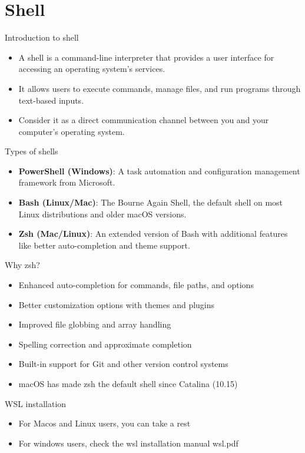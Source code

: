\section{Shell}

\begin{frame}[fragile]{Introduction to shell}
	\begin{itemize}
		\item A shell is a command-line interpreter that provides a user interface for accessing an operating system's services.
		\item It allows users to execute commands, manage files, and run programs through text-based inputs.
		\item Consider it as a direct communication channel between you and your computer's operating system.
	\end{itemize}
\end{frame}

\begin{frame}[fragile]{Types of shells}
	\begin{itemize}
		\item \textbf{PowerShell (Windows)}: A task automation and configuration management framework from Microsoft.
		\item \textbf{Bash (Linux/Mac)}: The Bourne Again Shell, the default shell on most Linux distributions and older macOS versions.
		\item \textbf{Zsh (Mac/Linux)}: An extended version of Bash with additional features like better auto-completion and theme support.
	\end{itemize}
\end{frame}

\begin{frame}[fragile]{Why zsh?}
	\begin{itemize}
		\item Enhanced auto-completion for commands, file paths, and options
		\item Better customization options with themes and plugins
		\item Improved file globbing and array handling
		\item Spelling correction and approximate completion
		\item Built-in support for Git and other version control systems
		\item macOS has made zsh the default shell since Catalina (10.15)
	\end{itemize}
\end{frame}
\begin{frame}[fragile]{WSL installation}
	\begin{itemize}
		\item For Macos and Linux users, you can take a rest
		\item For windows users, check the wsl installation manual wsl.pdf
	\end{itemize}
\end{frame}

